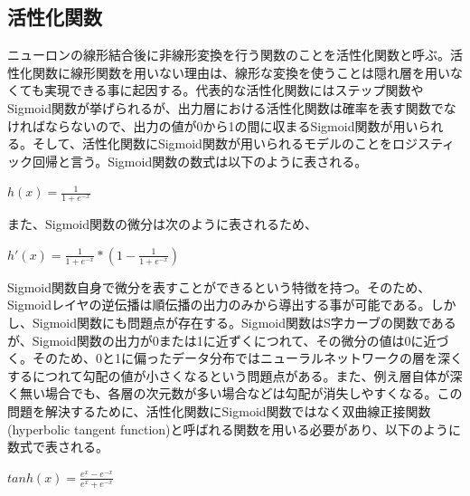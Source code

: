 \documentclass{article}
\begin{document}

\subsection{活性化関数}

ニューロンの線形結合後に非線形変換を行う関数のことを活性化関数と呼ぶ。活性化関数に線形関数を用いない理由は、線形な変換を使うことは隠れ層を用いなくても実現できる事に起因する。代表的な活性化関数にはステップ関数やSigmoid関数が挙げられるが、出力層における活性化関数は確率を表す関数でなければならないので、出力の値が0から1の間に収まるSigmoid関数が用いられる。そして、活性化関数にSigmoid関数が用いられるモデルのことをロジスティック回帰と言う。Sigmoid関数の数式は以下のように表される。



\begin{center}
\begin{math}
h(x) = \frac{1}{1+e^{-x}} 
\end{math}
\end{center}


また、Sigmoid関数の微分は次のように表されるため、

\begin{center}
\begin{math}
h'(x) = \frac{1}{1+e^{-x}} * (1 - \frac{1}{1+e^{-x}})
\end{math}
\end{center}

Sigmoid関数自身で微分を表すことができるという特徴を持つ。そのため、Sigmoidレイヤの逆伝播は順伝播の出力のみから導出する事が可能である。しかし、Sigmoid関数にも問題点が存在する。Sigmoid関数はS字カーブの関数であるが、Sigmoid関数の出力が0または1に近ずくにつれて、その微分の値は0に近づく。そのため、0と1に偏ったデータ分布ではニューラルネットワークの層を深くするにつれて勾配の値が小さくなるという問題点がある。また、例え層自体が深く無い場合でも、各層の次元数が多い場合などは勾配が消失しやすくなる。この問題を解決するために、活性化関数にSigmoid関数ではなく双曲線正接関数(hyperbolic tangent function)と呼ばれる関数を用いる必要があり、以下のように数式で表される。


\begin{center}
\begin{math}
tanh(x) =  \frac{e^{x}-e^{-x}} {e^{x}+e^{-x}} 
\end{math}
\end{center}
\end{document}
